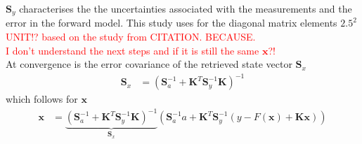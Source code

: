 $\mathbf{S}_y$ characterises the the uncertainties associated with the measurements and the error in the forward model. This study uses for the diagonal matrix elements $2.5^2$ \textcolor{red}{UNIT!? based on the study from CITATION. BECAUSE.}
\\
%
\textcolor{red}{I don't understand the next steps and if it is still the same $\mathbf{x}$?!} 
\\
At convergence is the error covariance of the retrieved state vector $\mathbf{S}_x$
\begin{align}
	\mathbf{S}_x & = \left( \mathbf{S}_a^{-1} + \mathbf{K}^T \mathbf{S}_y^{-1} \mathbf{K} \right)^{-1}
\end{align}
which follows for $\mathbf{x}$
\begin{align}
	\mathbf{x} & = \underbrace{\left( \mathbf{S}_a^{-1} + \mathbf{K}^T \mathbf{S}_y^{-1} \mathbf{K} \right)^{-1} }_\text{$\mathbf{S}_x$} \left( \mathbf{S}_a^{-1} a + \mathbf{K}^T \mathbf{S}_y^{-1} \left(y - F(\mathbf{x}) + \mathbf{K} \mathbf{x} \right)  \right)
\end{align}
